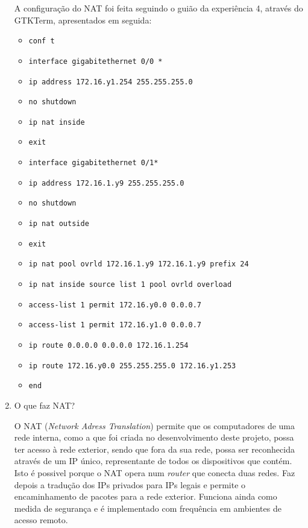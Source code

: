 \documentclass{article}
\begin{document}
\begin{enumerate}
A configuração do NAT foi feita seguindo o guião da experiência 4, através do GTKTerm, apresentados em seguida:
\begin{itemize}
    \item  \texttt{conf t}
    \item  \texttt{interface gigabitethernet 0/0 *}
    \item  \texttt{ip address 172.16.y1.254 255.255.255.0}
    \item  \texttt{no shutdown}
    \item  \texttt{ip nat inside}
    \item  \texttt{exit}
    \item  \texttt{interface gigabitethernet 0/1*}
    \item  \texttt{ip address 172.16.1.y9 255.255.255.0}
    \item  \texttt{no shutdown}
    \item  \texttt{ip nat outside}
    \item  \texttt{exit}
    \item  \texttt{ip nat pool ovrld 172.16.1.y9 172.16.1.y9 prefix 24}
    \item  \texttt{ip nat inside source list 1 pool ovrld overload}
    \item  \texttt{access-list 1 permit 172.16.y0.0 0.0.0.7}
    \item  \texttt{access-list 1 permit 172.16.y1.0 0.0.0.7}
    \item  \texttt{ip route 0.0.0.0 0.0.0.0 172.16.1.254}
    \item  \texttt{ip route 172.16.y0.0 255.255.255.0 172.16.y1.253}
    \item  \texttt{end}
\end{itemize}


\item O que faz NAT?

O NAT (\textit{Network Adress Translation}) permite que os computadores de uma rede interna, como a que foi criada no desenvolvimento deste projeto, possa ter acesso à rede exterior, sendo que fora da sua rede, possa ser reconhecida através de um IP único, representante de todos os dispositivos que contém.
Isto é possivel porque o NAT opera num \textit{router} que conecta duas redes. Faz depois a tradução dos IPs privados para IPs legais e permite o encaminhamento de pacotes para a rede exterior.
Funciona ainda como medida de segurança e é implementado com frequência em ambientes de acesso remoto.

\end{enumerate}
\end{document}

